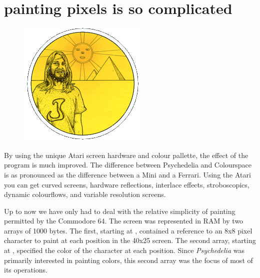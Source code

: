 \chapter{painting pixels is so complicated} 
\label{sec:painting}
\rhead[]{\leftmark}
\lstset{style=6502Style}

\begin{definition}
\setlength{\intextsep}{0pt}%
\setlength{\columnsep}{3pt}%
\begin{figure}
\includegraphics[width=\linewidth]{src/callout/psych.png} 
\end{figure}
\small
By using the
unique Atari screen hardware and colour pallette, the effect of the program is
much improved.  The difference between Psychedelia and Colourspace is as
pronounced as the difference between a Mini and a Ferrari.  Using the Atari you
can get curved screens, hardware reflections, interlace effects, stroboscopics,
dynamic colourflows, and variable resolution screens.  
\end{definition}

Up to now we have only had to deal with the relative simplicity of painting permitted by the
Commodore 64. The screen was represented in RAM by two arrays of 1000 bytes. The first,
starting at , contained a reference to an 8x8 pixel character to paint at
each position in the 40x25 screen. The second array, starting at , specified
the color of the character at each position. Since \textit{Psychedelia} was primarily interested
in painting colors, this second array was the focus of most of its operations. 

